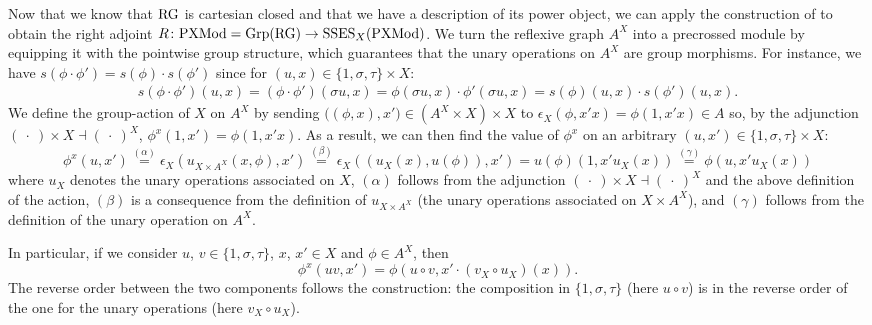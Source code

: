 \documentclass[a4paper, british, reqno]{amsart}
\newcommand*{\from}{\colon}
\newcommand*{\placeholder}{\:\cdot\:}
\newcommand*{\adj}{\dashv}
\newcommand*{\CatName}[1]{\textnormal{#1}}
\newcommand*{\Grp}{\CatName{Grp}}
\newcommand*{\PXMod}{\CatName{PXMod}}
\newcommand*{\RG}{\CatName{RG}}
\newcommand*{\SSES}{\CatName{SSES}}
\theoremstyle{definition}
\theoremstyle{remark}
\begin{document}
Now that we know that \(\RG\) is cartesian closed and that we have a description of its power object, we can apply the construction of \cite[Proposition~5.3]{Gra12} to obtain the right adjoint \(R \from \PXMod = \Grp(\RG) \to \SSES_X(\PXMod)\). We turn the reflexive graph \(A^X\) into a precrossed module by equipping it with the pointwise group structure, which guarantees that the unary operations on \(A^X\) are group morphisms. For instance, we have \(s(\phi\cdot \phi')=s(\phi)\cdot s(\phi')\) since for \((u,x)\in \{1,\sigma, \tau\}\times X\):
\begin{align*}
	s(\phi\cdot\phi')(u,x)=(\phi\cdot\phi')(\sigma u,x)=\phi(\sigma u,x)\cdot\phi'(\sigma u,x)=s(\phi)(u,x)\cdot s(\phi')(u,x)\text{.}
\end{align*}
We define the group-action of \(X\) on \(A^X\) by sending \(\bigl((\phi,x),x'\bigr) \in (A^X \times X) \times X\) to \(\epsilon_X(\phi,x'x)=\phi(1,x'x) \in A\) so, by the adjunction \((\placeholder) \times X \adj (\placeholder)^X\), \(\phi^x(1,x') = \phi(1,x'x)\). As a result, we can then find the value of \(\phi^x\) on an arbitrary \((u,x') \in \{1,\sigma,\tau\} \times X\):
\begin{equation}
	\label{eq - complete description of the action of X on the power object}
	\phi^x(u,x')\overset{(\alpha)}{=}\epsilon_X\left(u_{X\times A^X}(x,\phi), x'\right)\overset{(\beta)}{=}\epsilon_X\left((u_X(x), u(\phi)), x'\right)=u(\phi)(1,x'u_X(x))\overset{(\gamma)}{=}\phi(u,x'u_X(x))
\end{equation}
where \(u_X\) denotes the unary operations associated on \(X\), \((\alpha)\) follows from the adjunction \((\placeholder) \times X \adj (\placeholder)^X\) and the above definition of the action, \((\beta)\) is a consequence from the definition of \(u_{X\times A^X}\) (the unary operations associated on \(X\times A^X\)), and \((\gamma)\) follows from the definition of the unary operation on \(A^X\).

In particular, if we consider \(u\), \(v\in \{1,\sigma,\tau\}\), \(x\), \(x'\in X\) and \(\phi\in A^X\), then
\begin{equation}
	\label{eq - action and composition clear}
	\phi^x(uv,x')=\phi(u\circ v,x'\cdot (v_X\circ u_X)(x))\text{.}
\end{equation}
The reverse order between the two components follows the construction: the composition in \(\{1,\sigma,\tau\}\) (here \(u \circ v\)) is in the reverse order of the one for the unary operations (here \(v_X\circ u_X\)).
\end{document}
